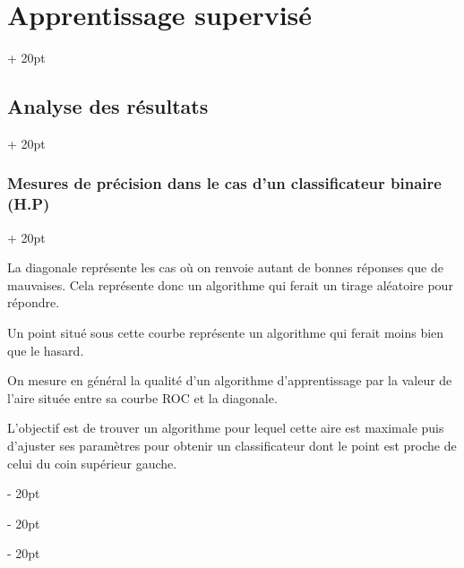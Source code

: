 \documentclass[a4paper, 12pt, twoside]{article}
\newcommand{\ind}[1][20pt]{\advance\leftskip + #1}
\newcommand{\deind}[1][20pt]{\advance\leftskip - #1}
\newenvironment{indt}[2][20pt]{#2 \par \ind[#1]}{\par \deind} %
\begin{document}
\begin{indt}{\section{Apprentissage supervisé}}
\begin{indt}{\subsection{Analyse des résultats}}
\begin{indt}{\subsubsection{Mesures de précision dans le cas d'un classificateur binaire (H.P)}}
\begin{center}
                \end{center}

                La diagonale représente les cas où on renvoie autant de bonnes réponses que de mauvaises.
                Cela représente donc un algorithme qui ferait un tirage aléatoire pour répondre.

                Un point situé sous cette courbe représente un algorithme qui ferait moins bien que le hasard.

                On mesure en général la qualité d'un algorithme d'apprentissage par la valeur de l'aire située entre sa courbe ROC et la  diagonale.

                L'objectif est de trouver un algorithme pour lequel cette aire est maximale puis d'ajuster ses paramètres pour obtenir un classificateur dont le point est proche de celui du coin supérieur gauche.
            \end{indt}
        \end{indt}
    \end{indt}

    \vspace{12pt}
    
\end{document}
